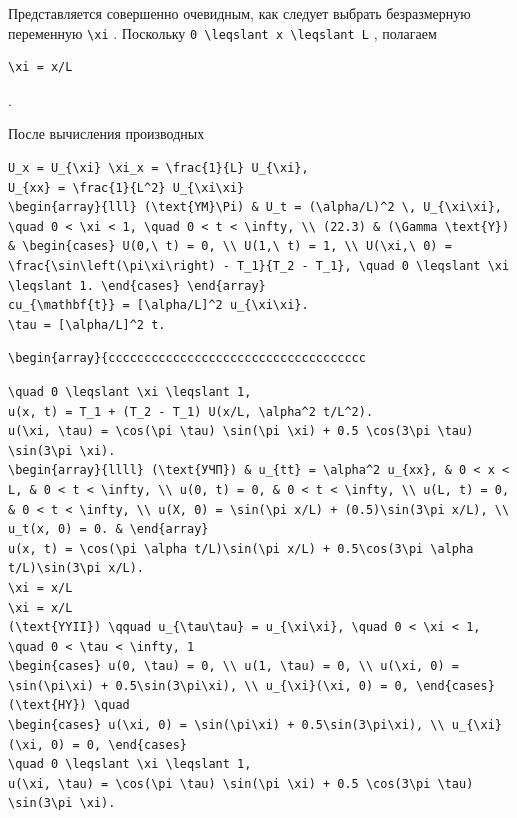 \documentclass[
  ukrainian,
]{article}
\begin{document}
Представляется совершенно очевидным, как следует выбрать безразмерную
переменную \texttt{\textbackslash{}xi} . Поскольку
\texttt{0\ \textbackslash{}leqslant\ x\ \textbackslash{}leqslant\ L} ,
полагаем

\begin{verbatim}
\xi = x/L
\end{verbatim}

.

После вычисления производных

\begin{verbatim}
U_x = U_{\xi} \xi_x = \frac{1}{L} U_{\xi},
U_{xx} = \frac{1}{L^2} U_{\xi\xi}
\begin{array}{lll} (\text{YM}\Pi) & U_t = (\alpha/L)^2 \, U_{\xi\xi}, \quad 0 < \xi < 1, \quad 0 < t < \infty, \\ (22.3) & (\Gamma \text{Y}) & \begin{cases} U(0,\ t) = 0, \\ U(1,\ t) = 1, \\ U(\xi,\ 0) = \frac{\sin\left(\pi\xi\right) - T_1}{T_2 - T_1}, \quad 0 \leqslant \xi \leqslant 1. \end{cases} \end{array}
cu_{\mathbf{t}} = [\alpha/L]^2 u_{\xi\xi}.
\tau = [\alpha/L]^2 t.
\end{verbatim}

\begin{verbatim}
\begin{array}{cccccccccccccccccccccccccccccccccccc
\end{verbatim}

\begin{verbatim}
\quad 0 \leqslant \xi \leqslant 1,
u(x, t) = T_1 + (T_2 - T_1) U(x/L, \alpha^2 t/L^2).
u(\xi, \tau) = \cos(\pi \tau) \sin(\pi \xi) + 0.5 \cos(3\pi \tau) \sin(3\pi \xi).
\begin{array}{llll} (\text{УЧП}) & u_{tt} = \alpha^2 u_{xx}, & 0 < x < L, & 0 < t < \infty, \\ u(0, t) = 0, & 0 < t < \infty, \\ u(L, t) = 0, & 0 < t < \infty, \\ u(X, 0) = \sin(\pi x/L) + (0.5)\sin(3\pi x/L), \\ u_t(x, 0) = 0. & \end{array}
u(x, t) = \cos(\pi \alpha t/L)\sin(\pi x/L) + 0.5\cos(3\pi \alpha t/L)\sin(3\pi x/L).
\xi = x/L
\xi = x/L
(\text{YYII}) \qquad u_{\tau\tau} = u_{\xi\xi}, \quad 0 < \xi < 1, \quad 0 < \tau < \infty, 1
\begin{cases} u(0, \tau) = 0, \\ u(1, \tau) = 0, \\ u(\xi, 0) = \sin(\pi\xi) + 0.5\sin(3\pi\xi), \\ u_{\xi}(\xi, 0) = 0, \end{cases}
(\text{HY}) \quad
\begin{cases} u(\xi, 0) = \sin(\pi\xi) + 0.5\sin(3\pi\xi), \\ u_{\xi}(\xi, 0) = 0, \end{cases}
\quad 0 \leqslant \xi \leqslant 1,
u(\xi, \tau) = \cos(\pi \tau) \sin(\pi \xi) + 0.5 \cos(3\pi \tau) \sin(3\pi \xi).
\end{verbatim}
\end{document}
